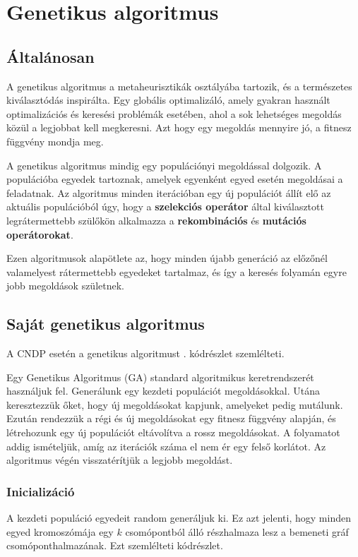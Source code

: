 \section{Genetikus algoritmus}\label{sec:GENETIKUS_ALGORITMUS}


\subsection{Általánosan}
A genetikus algoritmus a metaheurisztikák osztályába tartozik, és a természetes kiválasztódás inspirálta.
Egy globális optimalizáló, amely gyakran használt optimalizációs és keresési problémák esetében,
ahol a sok lehetséges megoldás közül a legjobbat kell megkeresni.
Azt hogy egy megoldás mennyire jó, a fitnesz függvény mondja meg.

A genetikus algoritmus mindig egy populációnyi megoldással dolgozik.
A populációba egyedek tartoznak, amelyek egyenként  egyed esetén megoldásai a feladatnak.
Az algoritmus minden iterációban egy új populációt állít elő az aktuális populációból úgy,
hogy a \textbf{szelekciós operátor} által kiválasztott legrátermettebb szülőkön alkalmazza a
\textbf{rekombinációs} és \textbf{mutációs operátorokat}.

Ezen algoritmusok alapötlete az, hogy minden újabb generáció
az előzőnél valamelyest rátermettebb egyedeket tartalmaz, és így a keresés folyamán
egyre jobb megoldások születnek.


\subsection{Saját genetikus algoritmus}
A CNDP esetén a genetikus algoritmust . kódrészlet szemlélteti.


Egy Genetikus Algoritmus (GA) standard algoritmikus keretrendszerét használjuk fel.
Generálunk egy kezdeti populációt megoldásokkal. Utána keresztezzük őket, hogy új megoldásokat kapjunk,
amelyeket pedig mutálunk. Ezután rendezzük a régi és új megoldásokat egy fitnesz függvény alapján,
és létrehozunk egy új populációt eltávolítva a rossz megoldásokat.
A folyamatot addig ismételjük, amíg az iterációk száma el nem ér egy felső korlátot.
Az algoritmus végén visszatérítjük a legjobb megoldást.


\subsubsection{Inicializáció}
A kezdeti populáció egyedeit random generáljuk ki. Ez azt jelenti,
hogy minden egyed kromoszómája egy $k$ csomópontból álló részhalmaza lesz
a bemeneti gráf csomóponthalmazának. Ezt szemlélteti  kódrészlet.


